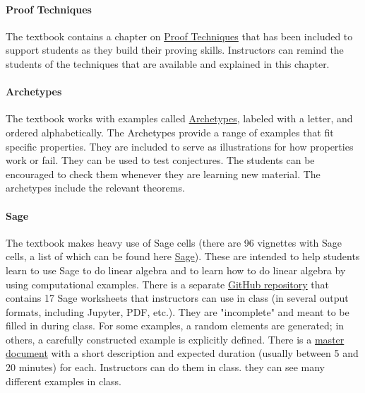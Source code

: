 \documentclass[10pt,]{article}
\begin{document}
\paragraph[{Proof Techniques}]{Proof Techniques}\hypertarget{paragraphs-14}{}
\hypertarget{p-32}{}%
The textbook contains a chapter on \href{https://books.aimath.org/fcla/appendix-PT.html}{Proof Techniques} that has been included to support students as they build their proving skills. Instructors can remind the students of the techniques that are available and explained in this chapter.%
\typeout{************************************************}
\typeout{************************************************}
\paragraph[{Archetypes}]{Archetypes}\hypertarget{paragraphs-15}{}
\hypertarget{p-33}{}%
The textbook works with examples called \href{https://books.aimath.org/fcla/appendix-A.html}{Archetypes}, labeled with a letter, and ordered alphabetically. The Archetypes provide a range of examples that fit specific properties. They are included to serve as illustrations for how properties work or fail. They can be used to test conjectures. The students can be encouraged to check them whenever they are learning new material. The archetypes include the relevant theorems.%
\typeout{************************************************}
\typeout{************************************************}
\paragraph[{Sage}]{Sage}\hypertarget{paragraphs-16}{}
\hypertarget{p-34}{}%
The textbook makes heavy use of Sage cells (there are 96 vignettes with Sage cells, a list of which can be found here \href{https://books.aimath.org/fcla/appendix-SL.html}{Sage}). These are intended to help students learn to use Sage to do linear algebra and to learn how to do linear algebra by using computational examples. There is a separate \href{https://github.com/rbeezer/sla}{GitHub repository} that contains 17 Sage worksheets that instructors can use in class (in several output formats, including Jupyter, PDF, etc.).  They are "incomplete" and meant to be filled in during class. For some examples, a random elements are generated; in others, a carefully constructed example is explicitly defined. There is a \href{https://github.com/rbeezer/sla/blob/master/worksheets/overview.pdf}{master document} with a short description and expected duration (usually between 5 and 20 minutes) for each. Instructors can do them in class. they can see many different examples in class.%
\typeout{************************************************}
\typeout{************************************************}
\end{document}
